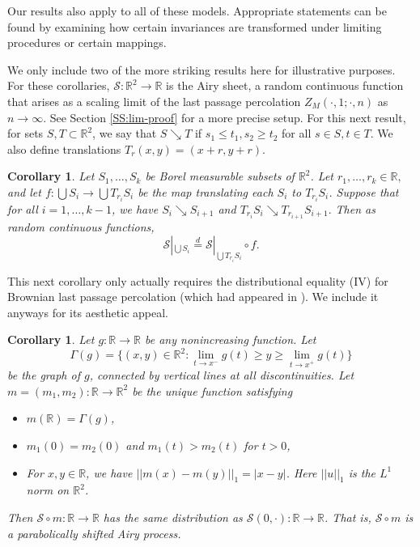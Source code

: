 \documentclass[aop, preprint]{imsart}
\theoremstyle{plain}
\newtheorem{corollary}[theorem]{Corollary}
\theoremstyle{definition}
\theoremstyle{plain}
\newcommand{\sset}{\subset}
\newcommand{\Ga}{\Gamma}
\newcommand{\scrS}{\mathcal{S}}
\newcommand{\R}{\mathds{R}}
\newcommand{\eqd}{\stackrel{d}{=}}
\begin{document}
Our results also apply to all of these models. Appropriate statements can be found by examining how certain invariances are transformed under limiting procedures or certain mappings. 

We only include two of the more striking results here for illustrative purposes. For these corollaries, $\scrS:\R^2 \to \R$ is the Airy sheet, a random continuous function that arises as a scaling limit of the last passage percolation $Z_M(\cdot, 1; \cdot, n)$ as $n \to \infty$. See Section \ref{SS:lim-proof} for a more precise setup. For this next result, for sets $S, T \sset \R^2$, we say that $S \searrow T$ if $s_1 \le t_1, s_2 \ge t_2$ for all $s \in S, t \in T$. 
We also define translations $T_r(x, y) = (x + r, y+r)$.

\begin{corollary}
	\label{C:airy-sheet}
	Let $S_1, \dots, S_k$ be Borel measurable subsets of $\R^2$. Let $r_1, \dots, r_k \in \R,$ and let  $f:\bigcup S_i \to \bigcup T_{r_i} S_i$ be the map translating each $S_i$ to $T_{r_i} S_i$. Suppose that for all $i =1, \dots, k-1$, we have
	$
	S_i \searrow S_{i+1}$ and  $T_{r_i} S_i \searrow T_{r_{i+1}} S_{i+1}.
	$
Then as random continuous functions,
	$$
	\scrS|_{\bigcup S_i} \eqd \scrS|_{\bigcup T_{r_i} S_i} \circ f.
	$$
\end{corollary}

This next corollary only actually requires the distributional equality (IV) for Brownian last passage percolation (which had appeared in \citep{borodin2019shift}). We include it anyways for its aesthetic appeal.

\begin{corollary}
	\label{C:airy-processes}
	Let $g:\R \to \R$ be any nonincreasing function. Let 
	$$
	\Ga(g) = \{(x, y) \in \R^2: \lim_{t \to x^-} g(t) \ge y \ge \lim_{t \to x^+} g(t) \}
	$$
	be the graph of $g$, connected by vertical lines at all discontinuities. Let $m = (m_1, m_2): \R \to \R^2$ be the unique function satisfying
	\begin{itemize}[nosep]
		\item $m(\R) = \Ga(g)$,
		\item $m_1(0) = m_2(0)$ and $m_1(t) > m_2(t)$ for $t > 0$,
		\item For $x, y \in \R$, we have $||m(x) - m(y)||_1 = |x - y|$. Here $||u||_1$ is the $L^1$ norm on $\R^2$.
	\end{itemize}
	Then $\scrS \circ m:\R\to \R$ has the same distribution as $\scrS(0, \cdot): \R \to \R$. That is, $\scrS \circ m$ is a parabolically shifted Airy process. 
\end{corollary}
\end{document}
